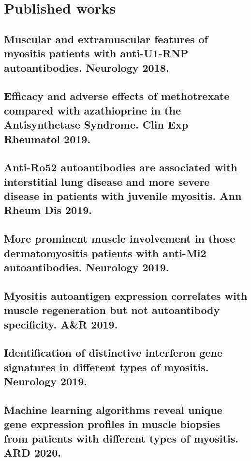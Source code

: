 \appendix
\chapter{Published works}

\section{Muscular and extramuscular features of myositis patients with anti-U1-RNP autoantibodies. Neurology 2018.}


\section{Efficacy and adverse effects of methotrexate compared with azathioprine in the Antisynthetase Syndrome. Clin Exp Rheumatol 2019.}


\section{Anti-Ro52 autoantibodies are associated with interstitial lung disease and more severe disease in patients with juvenile myositis. Ann Rheum Dis 2019.}


\section{More prominent muscle involvement in those dermatomyositis patients with anti-Mi2 autoantibodies. Neurology 2019.}


\section{Myositis autoantigen expression correlates with muscle regeneration but not autoantibody specificity. A\&R 2019.}


\section{Identification of distinctive interferon gene signatures in different types of myositis. Neurology 2019.}


\section{Machine learning algorithms reveal unique gene expression profiles in muscle biopsies from patients with different types of myositis. ARD 2020.}
